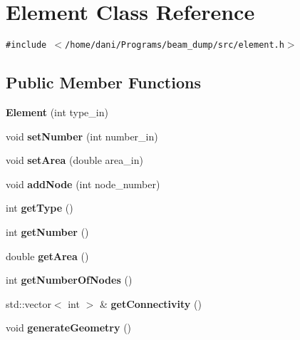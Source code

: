 \hypertarget{classElement}{
\section{Element Class Reference}
\label{classElement}
}
{\tt \#include $<$/home/dani/Programs/beam\_\-dump/src/element.h$>$}

\subsection*{Public Member Functions}
\begin{CompactItemize}
\item 
\hypertarget{classElement_4e6e261243d3b4580ae7b4c266d5ce5f}{
\textbf{Element} (int type\_\-in)}
\label{classElement_4e6e261243d3b4580ae7b4c266d5ce5f}

\item 
\hypertarget{classElement_c9e6cfa50bdbdbe7fa8895fec7490c89}{
void \textbf{setNumber} (int number\_\-in)}
\label{classElement_c9e6cfa50bdbdbe7fa8895fec7490c89}

\item 
\hypertarget{classElement_bf8a7a490cad2431443286d7ee615aa7}{
void \textbf{setArea} (double area\_\-in)}
\label{classElement_bf8a7a490cad2431443286d7ee615aa7}

\item 
\hypertarget{classElement_a838e2bc18a65fffaa3a74da5767650c}{
void \textbf{addNode} (int node\_\-number)}
\label{classElement_a838e2bc18a65fffaa3a74da5767650c}

\item 
\hypertarget{classElement_8bd9315dc4eb7b59f47410347375bf0e}{
int \textbf{getType} ()}
\label{classElement_8bd9315dc4eb7b59f47410347375bf0e}

\item 
\hypertarget{classElement_8de2b9d656140b6178581da489edf199}{
int \textbf{getNumber} ()}
\label{classElement_8de2b9d656140b6178581da489edf199}

\item 
\hypertarget{classElement_227a96bf84d82893af37a14650561eee}{
double \textbf{getArea} ()}
\label{classElement_227a96bf84d82893af37a14650561eee}

\item 
\hypertarget{classElement_54738e08d76563f2ffb5b6aef0f38981}{
int \textbf{getNumberOfNodes} ()}
\label{classElement_54738e08d76563f2ffb5b6aef0f38981}

\item 
\hypertarget{classElement_c6df9864bc31d99d8942e7c85533e9aa}{
std::vector$<$ int $>$ \& \textbf{getConnectivity} ()}
\label{classElement_c6df9864bc31d99d8942e7c85533e9aa}

\item 
\hypertarget{classElement_bd3cfd73fd15f802578207411d2740bb}{
void \textbf{generateGeometry} ()}
\label{classElement_bd3cfd73fd15f802578207411d2740bb}

\end{CompactItemize}

